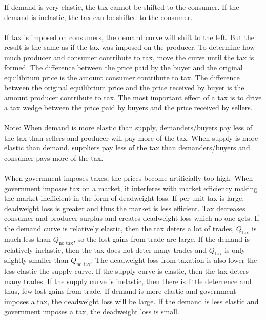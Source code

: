 \documentclass[12pt]{article}
\begin{document}
If demand is very elastic, the tax cannot be shifted to the consumer. If the demand is inelastic, the tax can be shifted to the consumer.  \\~\\ 
If tax is imposed on consumers, the demand curve will shift to the left. But the result is the same as if the tax was imposed on the producer.
To determine how much producer and consumer contribute to tax, move the curve until the tax is formed. The difference between the price paid by the buyer and the original equilibrium price is the amount consumer contribute to tax. The difference between the original equilibrium price and the price received by buyer is the amount producer contribute to tax.
The most important effect of a tax is to drive a tax wedge between the price paid by buyers and the price received by sellers. \\~\\ Note:  When demand is more elastic than supply, demanders/buyers pay less of the tax than sellers and producer will pay more of the tax. When supply is more elastic than demand, suppliers pay less of the tax than demanders/buyers and consumer pays more of the tax. \\~\\
When government imposes taxes, the prices become artificially too high. 
When government imposes tax on a market, it interferes with market efficiency making the market inefficient in the form of deadweight loss. If per unit tax is large, deadweight loss is greater and thus the market is less efficient. 
Tax decreases consumer and producer surplus and creates deadweight loss which no one gets. If the demand curve is relatively elastic, then the tax deters a lot of trades, $Q_{\text{tax}}$ is much less than $Q_{\text{no tax}}$, so the lost gains from trade are large. If the demand is relatively inelastic, then the tax does not deter many trades and $Q_{\text{tax}}$ is only slightly smaller than $Q_{\text{no tax}}$. The deadweight loss from taxation is also lower the less elastic the supply curve. If the supply curve is elastic, then the tax deters many trades. If the supply curve is inelastic, then there is little deterrence and thus, few lost gains from trade. If demand is more elastic and government imposes a tax, the deadweight loss will be large. If the demand is less elastic and government imposes a tax, the deadweight loss is small. 
\end{document}
